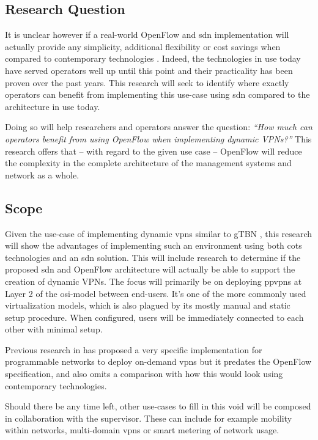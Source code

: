 	\subsection*{Research Question} %
	\label{sub:research_question}
	It is unclear however if a real-world OpenFlow and \ac{sdn} implementation will actually provide any simplicity, additional flexibility or cost savings when compared to contemporary technologies \cite{programmability-answer}. Indeed, the technologies in use today have served operators well up until this point and their practicality has been proven over the past years. 
	This research will seek to identify where exactly operators can benefit from implementing this use-case using \ac{sdn} compared to the architecture in use today. 

	Doing so will help researchers and operators answer the question: \textsl{``How much can operators benefit from using OpenFlow when implementing dynamic VPNs?''}
	This research offers that -- with regard to the given use case -- OpenFlow will reduce the complexity in the complete architecture of the management systems and network as a whole.


	\subsection*{Scope} %
	\label{sub:scope}
	Given the use-case of implementing dynamic \acp{vpn} similar to gTBN \cite{gtbn}, this research will show the advantages of implementing such an environment using both \ac{cots} technologies and an \ac{sdn} solution. This will include research to determine if the proposed \ac{sdn} and OpenFlow architecture will actually be able to support the creation of dynamic VPNs. The focus will primarily be on deploying \acp{ppvpn} at Layer 2 of the \acs{osi}-model between end-users. It's one of the more commonly used virtualization models, which is also plagued by its mostly manual and static setup procedure. When configured, users will be immediately connected to each other with minimal setup.
	
	Previous research in \cite{net-prog-vpn} has proposed a very specific implementation for programmable networks to deploy on-demand \acp{vpn} but it predates the OpenFlow specification, and also omits a comparison with how this would look using contemporary technologies.

	Should there be any time left, other use-cases to fill in this void will be composed in collaboration with the supervisor. These can include for example mobility within networks, multi-domain \acp{vpn} or smart metering of network usage.

